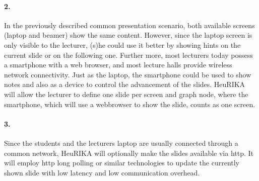 \documentclass[a4paper,11pt,notitlepage]{scrreprt}
\begin{document}
\paragraph{2.} In the previously described common presentation scenario, both available screens (laptop and beamer) show the same content. However, since the laptop screen is only visible to the lecturer, (s)he could use it better by showing hints on the current slide or on the following one. Further more, most lecturers today possess a smartphone with a web browser, and most lecture halls provide wireless network connectivity. Just as the laptop, the smartphone could be used to show notes and also as a device to control the advancement of the slides. HeuRIKA will allow the lecturer to define one slide per screen and graph node, where the smartphone, which will use a webbrowser to show the slide, counts as one screen.

\paragraph{3.} Since the students and the lecturers laptop are usually connected through a common network, HeuRIKA will optionally make the slides available via http. It will employ http long polling or similar technologies to update the currently shown slide with low latency and low communication overhead.
\end{document}
